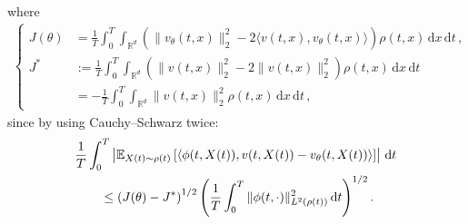 \documentclass[oneside,11pt]{article}
\theoremstyle{remark}
\begin{document}
where 
\begin{align*}
\begin{cases}
    J(\theta)
    &=
    \frac1T
    \int_0^T
    \int_{\mathbb R^d}
    \left(
        \|v_\theta(t,x)\|_2^2
        -
        2\langle v(t,x),v_\theta(t,x)\rangle
    \right)
    \rho(t,x)\,\mathrm dx\,\mathrm dt \,,\\
    J^*
    &:=
    \frac1T
    \int_0^T
    \int_{\mathbb R^d}
    \left(
        \|v(t,x)\|_2^2
        -
        2\|v(t,x)\|_2^2
    \right)
    \rho(t,x)\,\mathrm dx\,\mathrm dt
    \\
    &=
    -
    \frac1T
    \int_0^T
    \int_{\mathbb R^d}
    \|v(t,x)\|_2^2
    \rho(t,x)\,\mathrm dx\,\mathrm dt \,,
\end{cases}
\end{align*}
since by using Cauchy--Schwarz twice:
\begin{align*}
&
\frac1T
\int_0^T
\left|
    \mathbb{E}_{X(t) \sim \rho(t)} \left[
    \left\langle
        \phi(t,X(t)),v(t,X(t))-v_\theta(t,X(t))
    \right\rangle
    \right]
\right|
\,\mathrm dt
\notag \\
&\qquad\leq
\left(J(\theta)-J^*\right)^{1/2}
\left(
    \frac1T
    \int_0^T
    \|\phi(t,\cdot)\|_{L^2(\rho(t))}^2
    \,\mathrm dt
\right)^{1/2}.
\end{align*}
\end{document}
